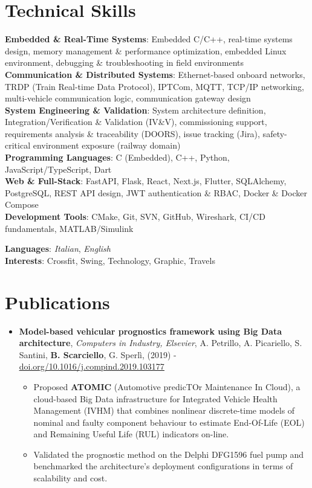 \documentclass[letterpaper,10pt]{article}
\newcommand{\resumeItem}[1]{
  \item\small{
    {#1 \vspace{-2pt}}
  }
}
\newcommand{\fancyurl}[2]{\textcolor{BlueViolet}{\href{#1}{\underline{#2}}}}
\newcommand{\resumePaperTitle}[5]{
    \vspace{2pt}
    \item
    \small{\textbf{#1}, \textit{#2}, #3, (#4) - #5} \\
}
\newcommand{\resumeSubHeadingPublicationsListStart}{\begin{itemize}[leftmargin=0.15in, rightmargin=0.05in, label={}]}
\newcommand{\resumeSubHeadingListEnd}{\end{itemize}}
\newcommand{\resumeItemListStart}{\begin{itemize}[rightmargin=0.1in]\vspace{-3pt}}
\newcommand{\resumeItemListEnd}{\end{itemize}\vspace{-3pt}}
\begin{document}
\section{Technical Skills}
 \begin{itemize}[leftmargin=0.15in, label={}]
    \small{\item{
     \textbf{Embedded \& Real-Time Systems}{: Embedded C/C++, real-time systems design, memory management \& performance optimization, embedded Linux environment, debugging \& troubleshooting in field environments} \\
     \textbf{Communication \& Distributed Systems}{: Ethernet-based onboard networks, TRDP (Train Real-time Data Protocol), IPTCom, MQTT, TCP/IP networking, multi-vehicle communication logic, communication gateway design} \\
     \textbf{System Engineering \& Validation}{: System architecture definition, Integration/Verification \& Validation (IV\&V), commissioning support, requirements analysis \& traceability (DOORS), issue tracking (Jira), safety-critical environment exposure (railway domain)} \\
     \textbf{Programming Languages}{: C (Embedded), C++, Python, JavaScript/TypeScript, Dart} \\
     \textbf{Web \& Full-Stack}{: FastAPI, Flask, React, Next.js, Flutter, SQLAlchemy, PostgreSQL, REST API design, JWT authentication \& RBAC, Docker \& Docker Compose} \\
     \textbf{Development Tools}{: CMake, Git, SVN, GitHub, Wireshark, CI/CD fundamentals, MATLAB/Simulink}
    }}
 \end{itemize}
 \textbf{Languages}: \textit{Italian}, \textit{English} \\
 \textbf{Interests}: Crossfit, Swing, Technology, Graphic, Travels

\section{Publications}
  \resumeSubHeadingPublicationsListStart
    \resumePaperTitle
      {Model-based vehicular prognostics framework using Big Data architecture}
      {Computers in Industry, Elsevier}
      {A. Petrillo, A. Picariello, S. Santini, \textbf{B. Scarciello}, G. Sperl\`i}
      {2019}
      {\fancyurl{https://doi.org/10.1016/j.compind.2019.103177}{doi.org/10.1016/j.compind.2019.103177}}
    \resumeItemListStart
      \resumeItem{
        Proposed \textbf{ATOMIC} (Automotive predicTOr Maintenance In Cloud), a cloud-based Big Data
        infrastructure for Integrated Vehicle Health Management (IVHM) that combines nonlinear
        discrete-time models of nominal and faulty component behaviour to estimate End-Of-Life (EOL)
        and Remaining Useful Life (RUL) indicators on-line.
      }
      \resumeItem{
        Validated the prognostic method on the Delphi DFG1596 fuel pump and benchmarked the
        architecture's deployment configurations in terms of scalability and cost.
      }
    \resumeItemListEnd
  \resumeSubHeadingListEnd

\end{document}
